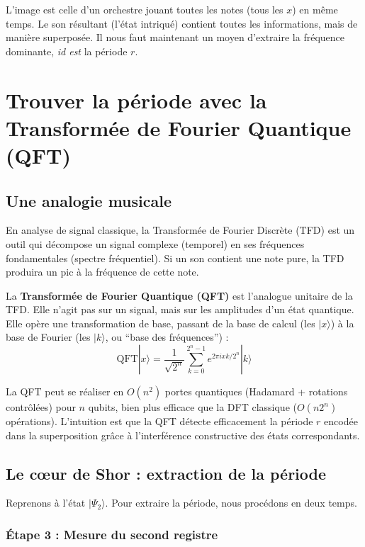 \documentclass[11pt,a4paper]{article}
\begin{document}
\begin{tcolorbox}[colback=green!5!white,colframe=green!75!black,title=Analogie musicale]
L'image est celle d'un orchestre jouant toutes les notes (tous les $x$) en même temps. Le son résultant (l'état intriqué) contient toutes les informations, mais de manière superposée. Il nous faut maintenant un moyen d'extraire la fréquence dominante, \textit{id est} la période $r$.
\end{tcolorbox}

\section{Trouver la période avec la Transformée de Fourier Quantique (QFT)}

\subsection{Une analogie musicale}

En analyse de signal classique, la Transformée de Fourier Discrète (TFD) est un outil qui décompose un signal complexe (temporel) en ses fréquences fondamentales (spectre fréquentiel). Si un son contient une note pure, la TFD produira un pic à la fréquence de cette note.

La \textbf{Transformée de Fourier Quantique (QFT)} est l'analogue unitaire de la TFD. Elle n'agit pas sur un signal, mais sur les amplitudes d'un état quantique. Elle opère une transformation de base, passant de la base de calcul (les $|x\rangle$) à la base de Fourier (les $|k\rangle$, ou ``base des fréquences'') :
\[\text{QFT}|x\rangle = \frac{1}{\sqrt{2^n}}\sum_{k=0}^{2^n-1} e^{2\pi ixk/2^n}|k\rangle\]

La QFT peut se réaliser en $O(n^2)$ portes quantiques (Hadamard + rotations contrôlées) pour $n$ qubits, bien plus efficace que la DFT classique ($O(n2^n)$ opérations). L'intuition est que la QFT détecte efficacement la période $r$ encodée dans la superposition grâce à l'interférence constructive des états correspondants.

\subsection{Le cœur de Shor : extraction de la période}

Reprenons à l'état $|\Psi_2\rangle$. Pour extraire la période, nous procédons en deux temps.

\subsubsection*{Étape 3 : Mesure du second registre}
\end{document}

